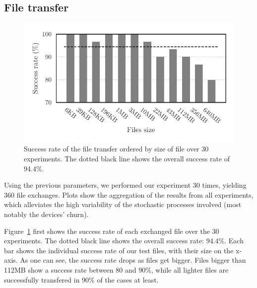 
\subsection{File transfer}
\label{sub:file_transfer}

\begin{figure}[t]
  \centering
  \includegraphics[width=0.9\columnwidth]{figures/completion_vs_size.pdf}

  \caption{\label{fig:completion_vs_size}
  Success rate of the file transfer ordered by size of file over 30 experiments.
  The dotted black line shows the overall success rate of 94.4\%.}
\end{figure}


Using the previous parameters, we performed our experiment 30 times, yielding 360 file exchanges. Plots show the aggregation of the results from all experiments, which alleviates the high variability of the stochastic processes involved (most notably the devices' churn).

Figure~\ref{fig:completion_vs_size} first shows the success rate of each exchanged file over the 30 experiments.
The dotted black line shows the overall success rate: 94.4\%. 
Each bar shows the individual success rate of our test files, with their size on the x-axis.
As one can see, the success rate drops as files get bigger.
Files bigger than 112MB show a success rate between 80 and 90\%, while all lighter files are successfully transfered in 90\% of the cases at least.



